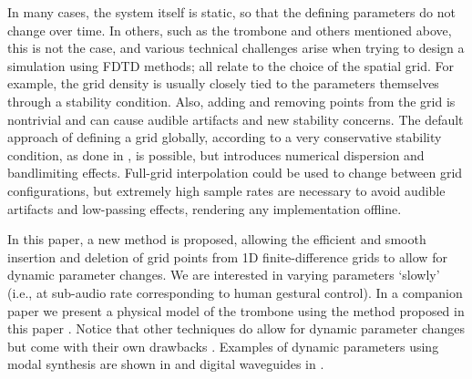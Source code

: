 In many cases, the system itself is static, so that the defining parameters do not change over time. In others, such as the trombone and others mentioned above, this is not the case, and various technical challenges arise when trying to design a simulation using FDTD methods; all relate to the choice of the spatial grid. For example, the grid density is usually closely tied to the parameters themselves through a stability condition.
Also, adding and removing points from the grid is nontrivial and can cause audible artifacts and new stability concerns. The default approach of defining a grid globally, according to a very conservative stability condition, as done in \cite{Willemsen2019}, is possible, but introduces numerical dispersion and bandlimiting effects. Full-grid interpolation \cite[Ch. 5]{bilbao2009} could be used to change between grid configurations, but extremely high sample rates are necessary to avoid audible artifacts and low-passing effects, rendering any implementation offline. 

In this paper, a new method is proposed, allowing the efficient and smooth insertion and deletion of grid points from 1D finite-difference grids to allow for dynamic parameter changes. We are interested in varying parameters `slowly' (i.e., at sub-audio rate corresponding to human gestural control). In a companion paper we present a physical model of the trombone using the method proposed in this paper \cite{Willemsen2021}. Notice that other techniques do allow for dynamic parameter changes but come with their own drawbacks \cite{bilbao2009}. Examples of dynamic parameters using modal synthesis \cite{morrison1993mosaic} are shown in \cite{Mehes2016, Willemsen2017} and digital waveguides \cite{Smith1992} in \cite{Michon2014}.



